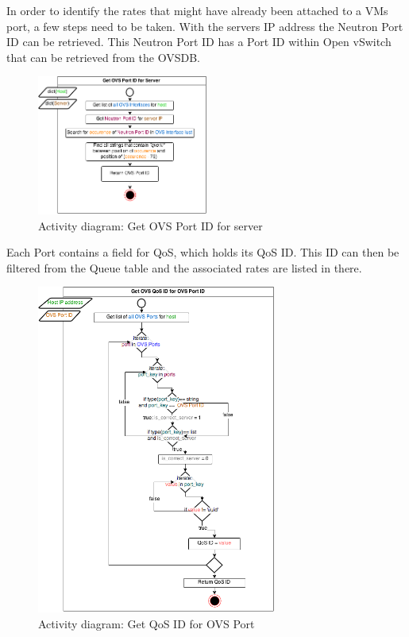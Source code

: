 In order to identify the rates that might have already been attached to a VMs port, a few steps need to be taken. With the servers IP address the Neutron Port ID can be retrieved. This Neutron Port ID has a Port ID within Open vSwitch that can be retrieved from the OVSDB. 

\begin{figure}[H]
\centering

\includegraphics[width=0.5\textwidth]{images/design/activity_get_ovs_port_server}

\caption{Activity diagram: Get OVS Port ID for server}
\end{figure}

Each Port contains a field for QoS, which holds its QoS ID. This ID can then be filtered from the Queue table and the associated rates are listed in there.

\begin{figure}[H]
\centering

\includegraphics[width=0.7\textwidth]{images/design/activity_get_qos_id_for_ovs_port}

\caption{Activity diagram: Get QoS ID for OVS Port}
\end{figure}

